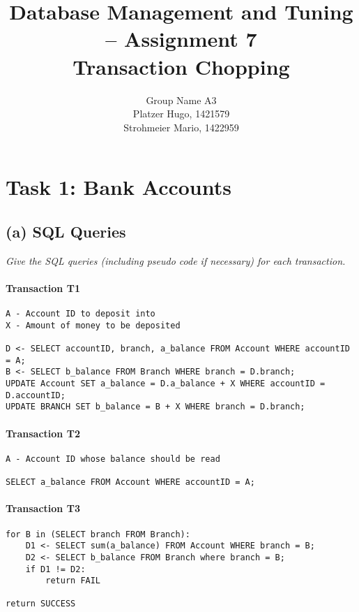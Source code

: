 \documentclass[11pt]{scrartcl}
\title{
  \textbf{\large Database Management and Tuning -- Assignment 7}\\
  Transaction Chopping
}
\author{
 Group Name A3\\
 \large Platzer Hugo, 1421579 \\
 \large Strohmeier Mario, 1422959
}
\begin{document}
\maketitle

\section*{Task 1:  Bank Accounts}

\subsection*{(a) SQL Queries}

{\it Give the SQL queries (including pseudo code if necessary) for each
transaction.}

\paragraph{Transaction T1}

{\small
\begin{verbatim}
A - Account ID to deposit into
X - Amount of money to be deposited

D <- SELECT accountID, branch, a_balance FROM Account WHERE accountID = A;
B <- SELECT b_balance FROM Branch WHERE branch = D.branch;
UPDATE Account SET a_balance = D.a_balance + X WHERE accountID = D.accountID;
UPDATE BRANCH SET b_balance = B + X WHERE branch = D.branch; 
\end{verbatim}
}

\paragraph{Transaction T2}
{\small
\begin{verbatim}
A - Account ID whose balance should be read

SELECT a_balance FROM Account WHERE accountID = A;
\end{verbatim}
}

\paragraph{Transaction T3}
{\small
\begin{verbatim}
for B in (SELECT branch FROM Branch):
    D1 <- SELECT sum(a_balance) FROM Account WHERE branch = B;
    D2 <- SELECT b_balance FROM Branch where branch = B;
    if D1 != D2:
        return FAIL

return SUCCESS
\end{verbatim}
}
\end{document}
